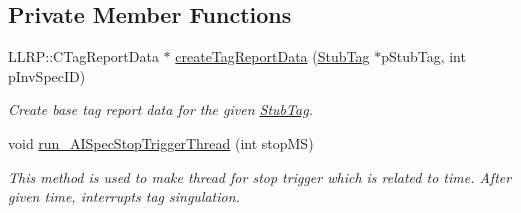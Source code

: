 \subsection*{Private Member Functions}
\begin{DoxyCompactItemize}
\item 
L\-L\-R\-P\-::\-C\-Tag\-Report\-Data $\ast$ \hyperlink{class_e_l_f_i_n_1_1_a_i_operation_ab691057f5895c3af2dc617f2fcf4d9c4}{create\-Tag\-Report\-Data} (\hyperlink{class_e_l_f_i_n_1_1_stub_tag}{Stub\-Tag} $\ast$p\-Stub\-Tag, int p\-Inv\-Spec\-I\-D)
\begin{DoxyCompactList}\small\item\em Create base tag report data for the given \hyperlink{class_e_l_f_i_n_1_1_stub_tag}{Stub\-Tag}. \end{DoxyCompactList}\item 
void \hyperlink{class_e_l_f_i_n_1_1_a_i_operation_a8cc8f6baacabcddac43853a5f72fa580}{run\-\_\-\-A\-I\-Spec\-Stop\-Trigger\-Thread} (int stop\-M\-S)
\begin{DoxyCompactList}\small\item\em This method is used to make thread for stop trigger which is related to time. After given time, interrupts tag singulation. \end{DoxyCompactList}\end{DoxyCompactItemize}
